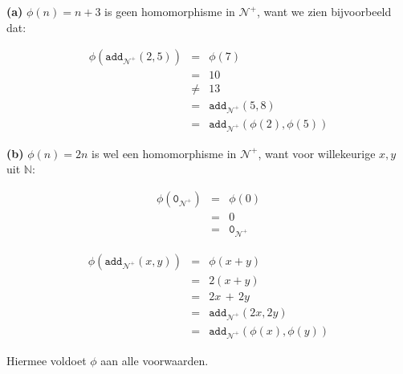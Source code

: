 \documentclass[a4paper,11pt]{article}
\begin{document}
\begin{description}

\item{\bf (a)} %
  $\phi(n) = n+3$ is geen homomorphisme in $\mathcal{N}^{+}$, want we zien
  bijvoorbeeld dat:

  \begin{eqnarray*}
    \phi(\texttt{add}_{\mathcal{N}^{+}}(2,5)) & = & \phi(7) \\
                          & = & 10 \\
                          & \ne & 13 \\
                          & = & \texttt{add}_{\mathcal{N}^{+}}(5,8) \\
                          & = & \texttt{add}_{\mathcal{N}^{+}}(\phi(2),\phi(5))
  \end{eqnarray*}

\item{\bf (b)} %
  $\phi(n) = 2n$ is wel een homomorphisme in $\mathcal{N}^{+}$, want voor
  willekeurige $x,y$ uit $\mathbb{N}$:

  \begin{eqnarray*}
    \phi(\texttt{0}_{\mathcal{N}^{+}}) & = & \phi(0) \\
                                    & = & 0 \\
                                    & = & \texttt{0}_{\mathcal{N}^{+}}
  \end{eqnarray*}

  \begin{eqnarray*}
    \phi(\texttt{add}_{\mathcal{N}^{+}}(x,y)) & = & \phi(x+y) \\
                          & = & 2(x+y) \\
                          & = & 2x \, + \, 2y \\
                          & = & \texttt{add}_{\mathcal{N}^{+}}(2x, 2y) \\
                          & = & \texttt{add}_{\mathcal{N}^{+}}(\phi(x), \phi(y))
  \end{eqnarray*}

  Hiermee voldoet $\phi$ aan alle voorwaarden.\\[2em]

\end{description}
\end{document}
